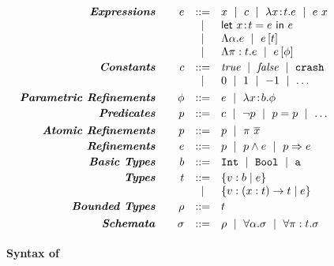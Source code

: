\newcommand{\ra}[1]{\renewcommand{\arraystretch}{#1}}
\ra{0.9}
\begin{figure}[t!]
\centering
$$
\begin{array}{rrcl}
\emphbf{Expressions} \quad 
  & e & ::=     & x 
                  \spmid c 
                  \spmid \efunt{x}{\rtyp}{e} 
                  \spmid \eapp{e}{x}      \\
  &   &  \spmid & \elet{x}{e}{e}{\rtyp}   \\
  &   &  \spmid & \etabs{\tvar}{e}  
                  \spmid \etapp{e}{\rtyp} \\ 
  &   &  \spmid & \epabs{\rvar}{\rtyp}{e}
                  \spmid \epapp{e}{\constraint}     \\[0.03in] 
  
\emphbf{Constants} \quad
  & c 
  & ::= 
  & \true \spmid \false \spmid \ecrash \\
  && \spmid &  0 \spmid 1 \spmid -1 \spmid \dots
  \\[0.05in] 
  
\emphbf{Parametric Refinements} \quad 
& \constraint & ::= & \reft 
                        \spmid \efunt{x}{b}{\constraint}  \\[0.03in]


\emphbf{Predicates} \quad 
  & \creft & ::= & c \spmid \lnot \creft 
                   \spmid \creft = \creft 
                   \spmid %
                   \dots  \\[0.05in] 

\emphbf{Atomic Refinements} \quad 
  & \areft & ::= & \creft 
                   \spmid \rvapp{\rvar}{x} \\[0.03in] 

\emphbf{Refinements} \quad 
  & \reft & ::= & \areft 
                  \spmid \areft \wedge \reft 
                  \spmid \areft \Rightarrow \reft \\[0.03in] 

\emphbf{Basic Types} \quad 
  & b 
  & ::= & \texttt{Int}
          \spmid \texttt{Bool}
          \spmid \texttt{a}    \\[0.03in]


\emphbf{Types} \quad 
  & \rtyp
  & ::=      & \tref{b}{\reft} \\
  & & \spmid & \trfun{x}{\rtyp}{\rtyp}{\reft} \\[0.03in]

\emphbf{Bounded Types} \quad 
  & \bt
  & ::= & \rtyp \\[0.05in]

\emphbf{Schemata} \quad 
  & \sigma
  & ::= & \bt
          \spmid \ttabs{\tvar}{\sigma}
          \spmid \tpabs{\rvar}{\rtyp}{\sigma} \\[0.03in]
\end{array}
$$
\caption{\textbf{Syntax of \corelan}}
\label{fig:syntax}
\end{figure}


